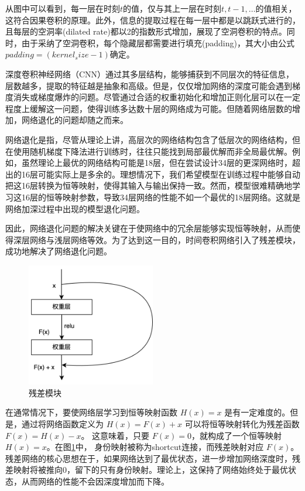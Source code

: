 从图中可以看到，每一层在时刻$t$的值，仅与其上一层在时刻$t, t-1, \dots$的值相关，这符合因果卷积的原理。此外，信息的提取过程在每一层中都是以跳跃式进行的，且每层的空洞率(dilated rate)都以2的指数形式增加，展现了空洞卷积的特点。同时，由于采纳了空洞卷积，每个隐藏层都需要进行填充(padding)，其大小由公式$padding = (kernel_size - 1)$确定。

深度卷积神经网络（CNN）通过其多层结构，能够捕获到不同层次的特征信息，层数越多，提取的特征越是抽象和高级。但是，仅仅增加网络的深度可能会遇到梯度消失或梯度爆炸的问题。尽管通过合适的权重初始化和增加正则化层可以在一定程度上缓解这一问题，使得训练多达数十层的网络成为可能。但随着网络层数的增加，网络退化的问题却随之而来\cite{吕国豪2014基于卷积神经网络的正则化方法}。

网络退化是指，尽管从理论上讲，高层次的网络结构包含了低层次的网络结构，但在使用随机梯度下降法进行训练时，往往只能找到局部最优解而非全局最优解。例如，虽然理论上最优的网络结构可能是18层，但在尝试设计34层的更深网络时，超出的16层可能实际上是多余的。理想情况下，我们希望模型在训练过程中能够自动把这16层转换为恒等映射，使得其输入与输出保持一致。然而，模型很难精确地学习这16层的恒等映射参数，导致34层网络的性能不如一个最优的18层网络。这就是网络加深过程中出现的模型退化问题。

因此，网络退化问题的解决关键在于使网络中的冗余层能够实现恒等映射，从而使得深层网络与浅层网络等效。为了达到这一目的，时间卷积网络引入了残差模块，成功地解决了网络退化问题。

\begin{figure}[htbp]
	\centering
	\includegraphics[width=0.5\textwidth]{figures/residual_block.png}
	\caption{残差模块}
	\label{residual_block}
\end{figure}

在通常情况下，要使网络层学习到恒等映射函数 $H(x) = x$ 是有一定难度的。但是，通过将网络函数定义为 $H(x) = F(x) + x$ 可以将恒等映射转化为残差函数 $F(x) = H(x) - x$。 这意味着，只要  $F(x) = 0$，就构成了一个恒等映射 $H(x) = x$。在图\ref{residual_block}中，
身份映射被称为shortcut连接，而残差映射对应 $F(x)$。残差网络的核心思想在于，如果网络达到了最优状态，进一步增加网络深度时，残差映射将被推向0，留下的只有身份映射。理论上，这保持了网络始终处于最优状态，从而网络的性能不会因深度增加而下降。


